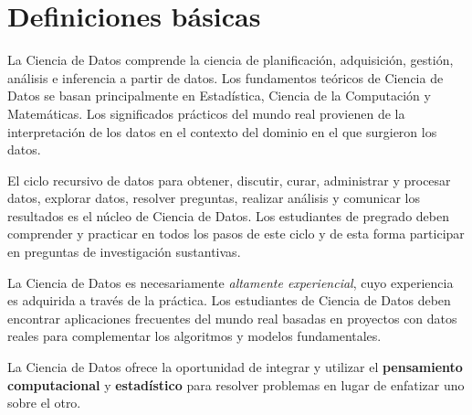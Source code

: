 \section{Definiciones básicas}\label{sec:ds-definiciones-basicas}

La Ciencia de Datos comprende la ciencia de planificación, adquisición, gestión, análisis e inferencia a partir de datos. Los fundamentos teóricos de Ciencia de Datos se basan principalmente en Estadística, Ciencia de la Computación y Matemáticas. Los significados prácticos del mundo real provienen de la interpretación de los datos en el contexto del dominio en el que surgieron los datos.

El ciclo recursivo de datos para obtener, discutir, curar, administrar y procesar datos, explorar datos, resolver preguntas, realizar análisis y comunicar los resultados es el núcleo de Ciencia de Datos. Los estudiantes de pregrado deben comprender y practicar en todos los pasos de este ciclo y de esta forma participar en preguntas de investigación sustantivas.

La Ciencia de Datos es necesariamente \emph{altamente experiencial}, cuyo experiencia es adquirida a través de la práctica. Los estudiantes de Ciencia de Datos deben encontrar aplicaciones frecuentes del mundo real basadas en proyectos con datos reales para complementar los algoritmos y modelos fundamentales.

La Ciencia de Datos ofrece la oportunidad de integrar y utilizar el \textbf{pensamiento computacional} y \textbf{estadístico} para resolver problemas en lugar de enfatizar uno sobre el otro.